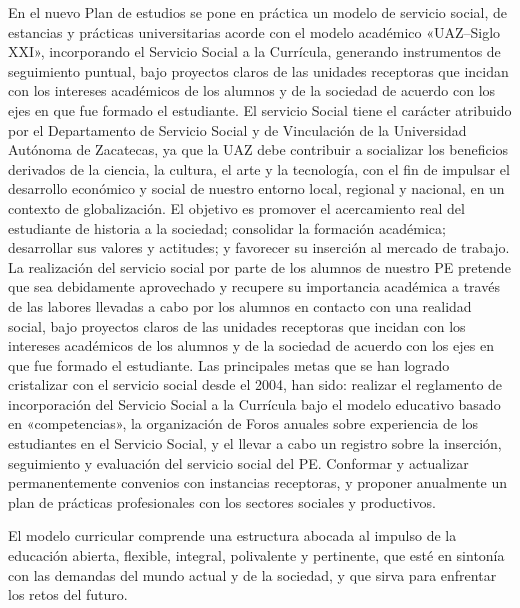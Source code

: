En el nuevo Plan de estudios  se pone en práctica un modelo de servicio
social, de estancias y prácticas universitarias acorde con el modelo académico
«UAZ--Siglo XXI»,  incorporando el Servicio Social a la Currícula, generando
instrumentos de seguimiento puntual, bajo proyectos claros de las unidades
receptoras que incidan con los intereses académicos de los alumnos y de la
sociedad de acuerdo con los ejes en que fue formado el estudiante.  El
servicio Social tiene el carácter atribuido por el Departamento de Servicio
Social y de Vinculación de la Universidad Autónoma de Zacatecas, ya que la
UAZ debe contribuir a socializar los beneficios derivados de la ciencia, la
cultura, el arte y la tecnología, con el fin de impulsar el desarrollo
económico y social de nuestro entorno local, regional y nacional, en  un
contexto de globalización. El objetivo es promover el acercamiento real del
estudiante de historia a la sociedad; consolidar la formación académica;
desarrollar sus valores y actitudes; y favorecer su inserción al mercado de
trabajo. La realización del servicio social por parte de los alumnos de
nuestro PE pretende que sea debidamente aprovechado y recupere su
importancia académica a través de las labores llevadas a cabo por los alumnos
en contacto con una realidad social,  bajo proyectos claros de las unidades
receptoras que incidan con los intereses académicos de los alumnos y de la
sociedad de acuerdo con los ejes en que fue formado el estudiante.  Las 
principales metas que se han logrado cristalizar con el servicio social desde el
2004, han sido: realizar el reglamento de incorporación del Servicio Social a
la Currícula bajo el modelo educativo basado en «competencias», la
organización de Foros anuales sobre experiencia de los estudiantes en el
Servicio Social, y el llevar a cabo un registro sobre la inserción, seguimiento
y evaluación del servicio social del PE. Conformar y actualizar
permanentemente convenios con instancias receptoras, y proponer anualmente
un plan de prácticas profesionales con los sectores sociales y productivos.

El modelo curricular comprende una estructura abocada al impulso de la
educación abierta, flexible, integral, polivalente y pertinente, que esté en sintonía
con las demandas del mundo actual y de la sociedad, y que sirva para enfrentar los retos del
futuro. 


